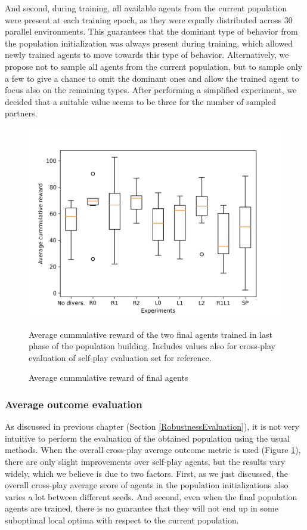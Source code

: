 And second, during training, all available agents from the current population were present at each training epoch, as they were equally distributed across 30 parallel environments.
This guarantees that the dominant type of behavior from the population initialization was always present during training, which allowed newly trained agents to move towards this type of behavior.
Alternatively, we propose not to sample all agents from the current population, but to sample only a few to give a chance to omit the dominant ones and allow the trained agent to focus also on the remaining types.
After performing a simplified experiment, we decided that a suitable value seems to be three for the number of sampled partners. 


\begin{figure}[!ht]
    \centering
    \includegraphics*[width=14cm]{../img/SimpleCnnExperimentsAvg.png}

    \caption{Average cummulative reward of final agents}
    \label{AvgCummulativeRewardEvaluated}
    \medskip
    \small 
    Average cummulative reward of the two final agents trained in last phase of the population building.
    Includes values also for cross-play evaluation of self-play evaluation set for reference. 

\end{figure}

\subsubsection{Average outcome evaluation}

As discussed in previous chapter (Section \ref{RobustnessEvaluation}), it is not very intuitive to perform the evaluation of the obtained population using the usual methods. 
When the overall cross-play average outcome metric is used (Figure \ref{AvgCummulativeRewardEvaluated}), there are only slight improvements over self-play agents, but the results vary widely, which we believe is due to two factors.
First, as we just discussed, the overall cross-play average score of agents in the population initializations also varies a lot between different seeds.
And second, even when the final population agents are trained, there is no guarantee that they will not end up in some suboptimal local optima with respect to the current population.



